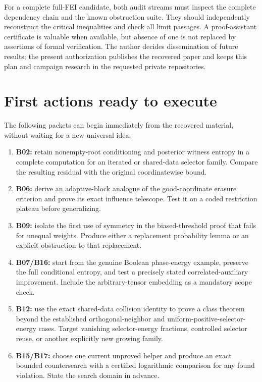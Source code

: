 \documentclass[11pt]{article}
\begin{document}
For a complete full-FEI candidate, both audit streams must inspect the complete dependency chain and the known obstruction suite. They should independently reconstruct the critical inequalities and check all limit passages. A proof-assistant certificate is valuable when available, but absence of one is not replaced by assertions of formal verification. The author decides dissemination of future results; the present authorization publishes the recovered paper and keeps this plan and campaign research in the requested private repositories.

\section{First actions ready to execute}

The following packets can begin immediately from the recovered material, without waiting for a new universal idea:
\begin{enumerate}
\item \textbf{B02:} retain nonempty-root conditioning and posterior witness entropy in a complete computation for an iterated or shared-data selector family. Compare the resulting residual with the original coordinatewise bound.
\item \textbf{B06:} derive an adaptive-block analogue of the good-coordinate erasure criterion and prove its exact influence telescope. Test it on a coded restriction plateau before generalizing.
\item \textbf{B09:} isolate the first use of symmetry in the biased-threshold proof that fails for unequal weights. Produce either a replacement probability lemma or an explicit obstruction to that replacement.
\item \textbf{B07/B16:} start from the genuine Boolean phase-energy example, preserve the full conditional entropy, and test a precisely stated correlated-auxiliary improvement. Include the arbitrary-tensor embedding as a mandatory scope check.
\item \textbf{B12:} use the exact shared-data collision identity to prove a class theorem beyond the established orthogonal-neighbor and uniform-positive-selector-energy cases. Target vanishing selector-energy fractions, controlled selector reuse, or another explicitly new growing family.
\item \textbf{B15/B17:} choose one current unproved helper and produce an exact bounded countersearch with a certified logarithmic comparison for any found violation. State the search domain in advance.
\end{enumerate}
\end{document}
